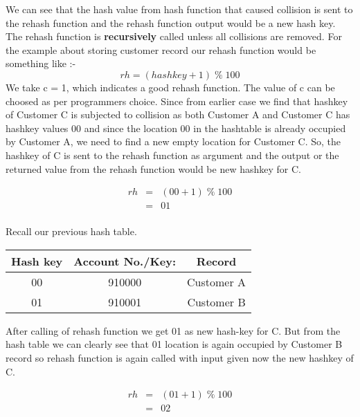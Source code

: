 \documentclass[12pt,a4paper]{article}
\begin{document}
\noindent We can see that the hash value from hash function that caused collision is sent to the rehash function and the rehash function output would be a new hash key. The rehash function is \textbf{recursively} called unless all collisions are removed. For the example about storing customer record our rehash function would be something like :-
$$rh = (hashkey + 1) \; \% \; 100$$
We take c = 1, which indicates a good rehash function. The value of c can be choosed as per programmers choice. Since from earlier case we find that hashkey of Customer C is subjected to collision as both Customer A and Customer C has hashkey values 00 and since the location 00 in the hashtable is already occupied by Customer A, we need to find a new empty location for Customer C. So, the hashkey of C is sent to the rehash function as argument and the output or the returned value from the rehash function would be new hashkey for C.

\begin{eqnarray*}
rh&=&(00 + 1)\;\%\;100 \\
&=&01 \\
\end{eqnarray*}

\noindent Recall our previous hash table.

\FloatBarrier
\begin{table}[H]

	\centering	
	\begin{tabular}{|c|c|c|} %

	\hline
	\textbf{Hash key} & \textbf{Account No./Key:} & \textbf{Record} \\

	\hline
	00 & 910000 & Customer A \\
	01 & 910001 & Customer B \\
	\hline

	\end{tabular}

\end{table}
\FloatBarrier

\noindent After calling of rehash function we get 01 as new hash-key for C. But from the hash table we can clearly see that 01 location is again occupied by Customer B record so rehash function is again called with input given now the new hashkey of C.

\begin{eqnarray*}
rh&=&(01 + 1)\;\%\;100 \\
&=&02 \\
\end{eqnarray*}
\end{document}
